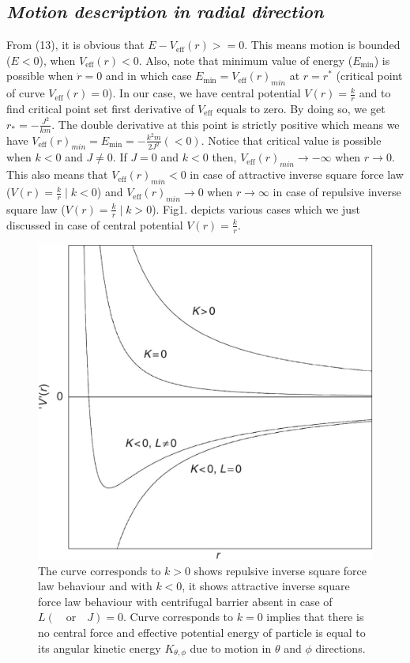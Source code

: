 \documentclass[conference]{IEEEtran}
\begin{document}
  \subsection{\normalsize{\emph{\textbf{Motion description in radial direction}}}}
  From (13), it is obvious that $E - V_{\mathrm{eff}}(r) >=0$. This means motion is bounded ($E < 0$), when $V_{\mathrm{eff}}(r) < 0$. Also, note that minimum value of energy ($E_{\mathrm{min}}$) is possible when $\dot{r} = 0$ and in which case $E_{\mathrm{min}} = V_{\mathrm{eff}}(r)_{min}$ at $r = r^{*}$ (critical point of curve $V_{\mathrm{eff}}(r) = 0$). In our case, we have central potential $V(r) = \frac{k}{r}$ and to find critical point set first derivative of $V_{\mathrm{eff}}$ equals to zero. By doing so, we get $r_{*} = - \frac{J^{2}}{km}$. The double derivative at this point is strictly positive which means we have $V_{\mathrm{eff}}(r)_{min} = E_{\mathrm{min}} = - \frac{k^{2}m}{2J^{2}} (<0)$. Notice that critical value is possible when $k<0$ and $J\not=0$. If $J=0$ and $k<0$ then, $V_{\mathrm{eff}}(r)_{min} \to -\infty$ when $r \to 0$. This also means that $V_{\mathrm{eff}}(r)_{min} < 0$ in case of attractive inverse square force law ($V(r) = \frac{k}{r} \mid{k < 0}$) and  $V_{\mathrm{eff}}(r)_{min} \to 0$ when $r \to \infty$ in case of repulsive inverse square law ($V(r) = \frac{k}{r} \mid{k >0}$). Fig1. depicts various cases which we just discussed in case of central potential $V(r) = \frac{k}{r}$.
  
 
\begin{figure}[htpb!]
\centerline{\includegraphics[scale=0.9]{fig1.png}}
\caption{The curve corresponds to $k>0$ shows repulsive inverse square force law behaviour and with $k<0$, it shows attractive inverse square force law behaviour with centrifugal barrier absent in case of $L (\quad \text{or}\quad J)=0$. Curve corresponds to $k=0$ implies that there is no central force and effective potential energy of particle is equal to its angular kinetic energy $K_{\theta,\phi}$ due to motion in $\theta$ and $\phi$ directions.}
\label{fig}
\end{figure}
\end{document}
